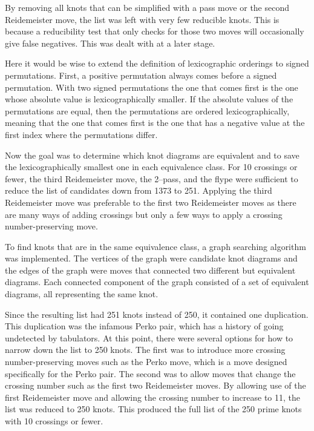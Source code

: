 \begin{paper}
By removing all knots that can be simplified with a pass move or the second
Reidemeister move, the list was left with very few reducible knots.
This is because a reducibility test that only checks for those two moves will
occasionally give false negatives.
This was dealt with at a later stage.


Here it would be wise to extend the definition of lexicographic orderings to
signed permutations.
First, a positive permutation always comes before a signed permutation.
With two signed permutations the one that comes first is the one whose absolute
value is lexicographically smaller.
If the absolute values of the permutations are equal, then the permutations are
ordered lexicographically, meaning that the one that comes first is the one that
has a negative value at the first index where the permutations differ.

Now the goal was to determine which knot diagrams are equivalent and to save the
lexicographically smallest one in each equivalence class.
For 10 crossings or fewer, the third Reidemeister move, the 2--pass, and the
flype were sufficient to reduce the list of candidates down from 1373 to 251.
Applying the third Reidemeister move was preferable to the first two
Reidemeister moves as there are many ways of adding crossings but only a few
ways to apply a crossing number-preserving move.

To find knots that are in the same equivalence class, a graph searching
algorithm was implemented.
The vertices of the graph were candidate knot diagrams and the edges of the
graph were moves that connected two different but equivalent diagrams.
Each connected component of the graph consisted of a set of equivalent diagrams,
all representing the same knot.

Since the resulting list had 251 knots instead of 250, it contained one
duplication.
This duplication was the infamous Perko pair, which has a history of going
undetected by tabulators.
At this point, there were several options for how to narrow down the list to
250 knots.
The first was to introduce more crossing number-preserving moves such as the
Perko move, which is a move designed specifically for the Perko pair.
The second was to allow moves that change the crossing number such as the first
two Reidemeister moves.
By allowing use of the first Reidemeister move and allowing the crossing number
to increase to 11, the list was reduced to 250 knots.
This produced the full list of the 250 prime knots with 10 crossings or fewer.


\end{paper}
